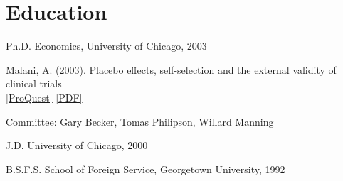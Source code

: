 \documentclass[11pt,letterpaper]{report}
\newcommand{\listitemspace}{0.25em}
\renewenvironment{itemize}
{\begin{list}{}{\setlength{\leftmargin}{0em}
                \setlength{\parskip}{0em}
                \setlength{\itemsep}{\listitemspace}
                \setlength{\parsep}{\listitemspace}}}
{\end{list}}
\begin{document}




    
    \section*{Education}

    \begin{tablist}

        \item[Ph.D.] \tab{}Economics, University of Chicago, 2003

        \item[]  \tab{}Malani, A. (2003). Placebo effects, self-selection and the external validity of clinical trials \\ \href{https://www.proquest.com/pqdtglobal/docview/305291636/B27E4F5857104EBAPQ/4?accountid=14657&sourcetype=Dissertations%20&%20Theses}{[ProQuest]} \href{https://github.com/anup-malani/website_personal/blob/main/publications/2003_Malani_DissertationPlaceboEffects.pdf}{[PDF]}
        
        \item[]  \tab{}Committee: Gary Becker, Tomas Philipson, Willard Manning
        
        \item[J.D.]  \tab{}University of Chicago, 2000
        \item[B.S.F.S.]  \tab{}School of Foreign Service, Georgetown University, 1992

    \end{tablist}
\end{document}
